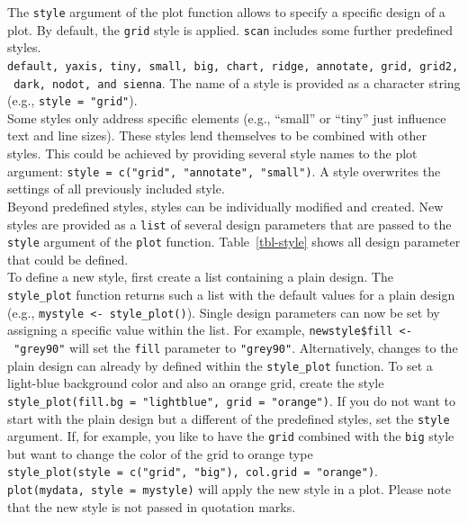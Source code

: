 \documentclass[
  letterpaper,
  DIV=11,
  numbers=noendperiod]{scrreprt}
\begin{document}
The \texttt{style} argument of the plot function allows to specify a
specific design of a plot. By default, the \texttt{grid} style is
applied. \texttt{scan} includes some further predefined styles.
\texttt{default,\ yaxis,\ tiny,\ small,\ big,\ chart,\ ridge,\ annotate,\ grid,\ grid2,\ dark,\ nodot,\ and\ sienna}.
The name of a style is provided as a character string (e.g.,
\texttt{style\ =\ "grid"}).\\
Some styles only address specific elements (e.g., ``small'' or ``tiny''
just influence text and line sizes). These styles lend themselves to be
combined with other styles. This could be achieved by providing several
style names to the plot argument:
\texttt{style\ =\ c("grid",\ "annotate",\ "small")}. A style overwrites
the settings of all previously included style.\\
Beyond predefined styles, styles can be individually modified and
created. New styles are provided as a \texttt{list} of several design
parameters that are passed to the \texttt{style} argument of the
\texttt{plot} function. Table~\ref{tbl-style} shows all design parameter
that could be defined.\\
To define a new style, first create a list containing a plain design.
The \texttt{style\_plot} function returns such a list with the default
values for a plain design (e.g.,
\texttt{mystyle\ \textless{}-\ style\_plot()}). Single design parameters
can now be set by assigning a specific value within the list. For
example, \texttt{newstyle\$fill\ \textless{}-\ "grey90"} will set the
\texttt{fill} parameter to \texttt{"grey90"}. Alternatively, changes to
the plain design can already by defined within the \texttt{style\_plot}
function. To set a light-blue background color and also an orange grid,
create the style
\texttt{style\_plot(fill.bg\ =\ "lightblue",\ grid\ =\ "orange")}. If
you do not want to start with the plain design but a different of the
predefined styles, set the \texttt{style} argument. If, for example, you
like to have the \texttt{grid} combined with the \texttt{big} style but
want to change the color of the grid to orange type
\texttt{style\_plot(style\ =\ c("grid",\ "big"),\ col.grid\ =\ "orange")}.
\texttt{plot(mydata,\ style\ =\ mystyle)} will apply the new style in a
plot. Please note that the new style is not passed in quotation marks.
\end{document}
